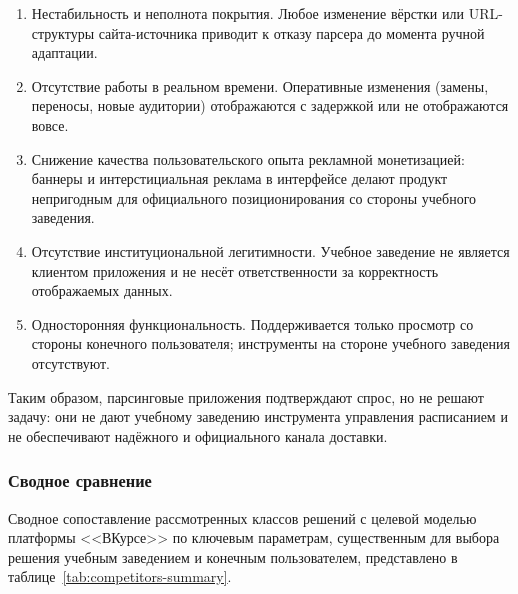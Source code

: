 \begin{enumerate}
  \item Нестабильность и неполнота покрытия. Любое изменение вёрстки или URL-структуры сайта-источника приводит к отказу парсера до момента ручной адаптации.
  \item Отсутствие работы в реальном времени. Оперативные изменения (замены, переносы, новые аудитории) отображаются с задержкой или не отображаются вовсе.
  \item Снижение качества пользовательского опыта рекламной монетизацией: баннеры и интерстициальная реклама в интерфейсе делают продукт непригодным для официального позиционирования со стороны учебного заведения.
  \item Отсутствие институциональной легитимности. Учебное заведение не является клиентом приложения и не несёт ответственности за корректность отображаемых данных.
  \item Односторонняя функциональность. Поддерживается только просмотр со стороны конечного пользователя; инструменты на стороне учебного заведения отсутствуют.
\end{enumerate}

Таким образом, парсинговые приложения подтверждают спрос, но не решают задачу: они не дают учебному заведению инструмента управления расписанием и не обеспечивают надёжного и официального канала доставки.

\subsubsection{Сводное сравнение}

Сводное сопоставление рассмотренных классов решений с целевой моделью платформы <<ВКурсе>> по ключевым параметрам, существенным для выбора решения учебным заведением и конечным пользователем, представлено в таблице~\ref{tab:competitors-summary}.

